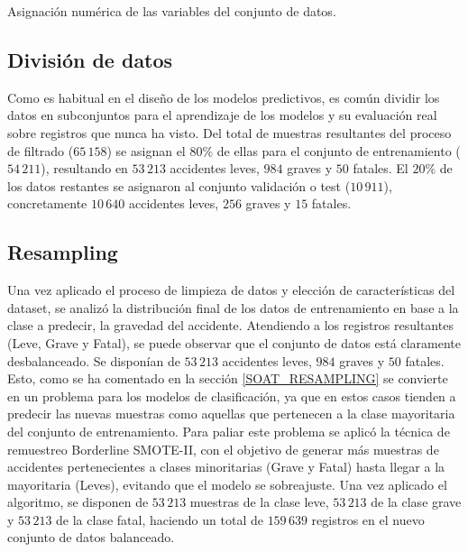 \begin{table}[ht]
	\caption{Asignación numérica de las variables del conjunto de datos.}
	\label{TransformacionDatosTabla}
\end{table}


\subsection*{División de datos}


Como es habitual en el diseño de los modelos predictivos, es común dividir los datos en subconjuntos para el aprendizaje de los modelos y su evaluación real sobre registros que nunca ha visto. Del total de muestras resultantes del proceso de filtrado ($65\,158$) se asignan el 80\% de ellas para el conjunto de entrenamiento ($54\,211$), resultando en $53\,213$ accidentes leves, $984$ graves y $50$ fatales. El $20\%$ de los datos restantes se asignaron al conjunto validación o test ($10\,911$), concretamente $10\,640$ accidentes leves, $256$ graves y $15$ fatales.


\subsection*{Resampling}

Una vez aplicado el proceso de limpieza de datos y elección de características del dataset, se analizó la distribución final de los datos de entrenamiento en base a la clase a predecir, la gravedad del accidente. Atendiendo a los registros resultantes (Leve, Grave y Fatal), se puede observar que el conjunto de datos está claramente desbalanceado. Se disponían de $53\,213$ accidentes leves, $984$ graves y $50$ fatales. Esto, como se ha comentado en la sección \ref{SOAT_RESAMPLING} se convierte en un problema para los modelos de clasificación, ya que en estos casos tienden a predecir las nuevas muestras como aquellas que pertenecen a la clase mayoritaria del conjunto de entrenamiento. Para paliar este problema se aplicó la técnica de remuestreo Borderline SMOTE-II, con el objetivo de generar más muestras de accidentes pertenecientes a clases minoritarias (Grave y Fatal) hasta llegar a la mayoritaria (Leves), evitando que el modelo se sobreajuste. Una vez aplicado el algoritmo, se disponen de $53\,213$ muestras de la clase leve, $53\,213$ de la clase grave y $53\,213$ de la clase fatal, haciendo un total de $159\,639$ registros en el nuevo conjunto de datos balanceado.

